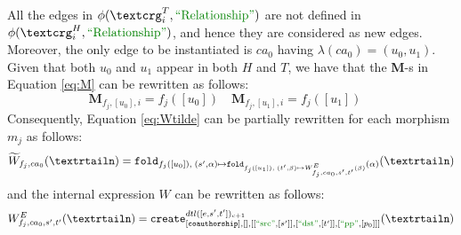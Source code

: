 \begin{example}[continues=ex:firstforgrammars2,label=ex:firstforgrammars3]
	All the edges in $\phi(\ngraph_i^T,\RELA)$ are not defined in $\phi(\ngraph_i^H,\RELA)$, and hence they are considered as new edges. Moreover, the only edge to be instantiated is $ca_0$ having $\lambda(ca_0)=(u_0,u_1)$. Given that both $u_0$ and $u_1$ appear in both $H$ and $T$, we have that the \textbf{M}-s in Equation \ref{eq:M} can be rewritten as follows:
\[\textbf{M}_{f_j,[u_0],i}=f_j([u_0])\quad \textbf{M}_{f_j,[u_1],i}=f_j([u_1])\quad \]
Consequently, Equation \vref{eq:Wtilde} can be partially rewritten for each morphism $m_j$ as follows:
\[\widetilde{W}_{f_j,ca_0}(\nested) =\texttt{fold}_{f_j([u_0]),\;(s',\alpha)\mapsto \texttt{fold}_{f_j([u_1]),\;(t',\beta)\mapsto W_{f_j,ca_0,s',t'}^E(\beta)}(\alpha)}(\nested)\]
and the internal expression $W$ can be rewritten as follows:
\[W_{f_j,ca_0,s',t'}^E(\nested)=\texttt{create}^{dtl([e,s',t'])_{c+1}}_{[\texttt{coauthorship}],[],[[\SRC,[s']],[\DST,[t']],[\mstr{pp}, [p_0]]]}(\nested)\]



\end{example}
